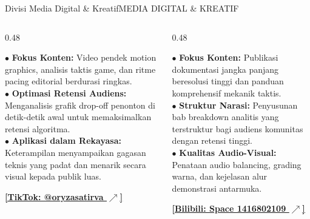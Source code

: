 \documentclass[aspectratio=169,11pt]{beamer}
\begin{document}
\begin{frame}{Divisi Media Digital \& Kreatif}{MEDIA DIGITAL \& KREATIF}
  \begin{columns}[t]
    \begin{column}{0.48\textwidth}
      \begin{tcolorbox}[colback=brandCardBg,colframe=brandBorder,arc=2mm,boxrule=0.6pt,boxsep=2pt,top=4pt,bottom=4pt,title={\footnotesize \bfseries \color{brandNavy} Saluran TikTok: @oryzasatirva}]
        {\scriptsize \color{brandDark}
        $\bullet$ \textbf{Fokus Konten:} Video pendek motion graphics, analisis taktis game, dan ritme pacing editorial berdurasi ringkas. \\
        $\bullet$ \textbf{Optimasi Retensi Audiens:} Menganalisis grafik drop-off penonton di detik-detik awal untuk memaksimalkan retensi algoritma. \\
        $\bullet$ \textbf{Aplikasi dalam Rekayasa:} Keterampilan menyampaikan gagasan teknis yang padat dan menarik secara visual kepada publik luas.
        } \par \vspace{4pt}
        {\scriptsize \href{https://www.tiktok.com/@oryzasatirva}{\color{brandBlue}\textbf{\underline{[TikTok: @oryzasatirva $\nearrow$]}}}}
      \end{tcolorbox}
    \end{column}

    \begin{column}{0.48\textwidth}
      \begin{tcolorbox}[colback=brandCardBg,colframe=brandBorder,arc=2mm,boxrule=0.6pt,boxsep=2pt,top=4pt,bottom=4pt,title={\footnotesize \bfseries \color{brandNavy} Saluran Bilibili: Space 1416802109}]
        {\scriptsize \color{brandDark}
        $\bullet$ \textbf{Fokus Konten:} Publikasi dokumentasi jangka panjang beresolusi tinggi dan panduan komprehensif mekanik taktis. \\
        $\bullet$ \textbf{Struktur Narasi:} Penyusunan bab breakdown analitis yang terstruktur bagi audiens komunitas dengan retensi tinggi. \\
        $\bullet$ \textbf{Kualitas Audio-Visual:} Penataan audio balancing, grading warna, dan kejelasan alur demonstrasi antarmuka.
        } \par \vspace{4pt}
        {\scriptsize \href{https://www.bilibili.tv/id/space/1416802109}{\color{brandBlue}\textbf{\underline{[Bilibili: Space 1416802109 $\nearrow$]}}}}
      \end{tcolorbox}
    \end{column}
  \end{columns}
\end{frame}
\end{document}
